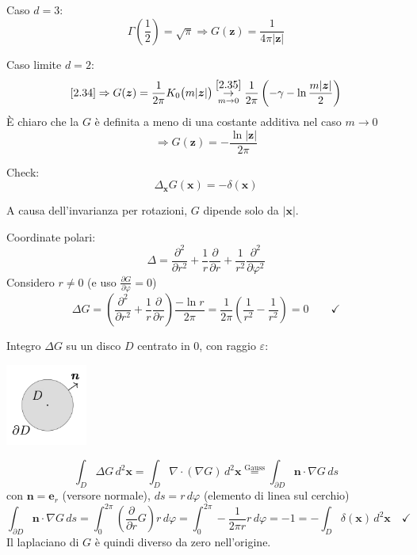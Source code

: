 \documentclass[a4paper,11pt]{report}
\newcommand{\vect}[1]{\boldsymbol{#1}}
\newcommand{\x}{\boldsymbol{x}}
\newcommand{\z}{\boldsymbol{z}}
\begin{document}
Caso $d=3$:
\begin{equation}
\Gamma\left(\frac{1}{2}\right)=\sqrt{\pi} \Rightarrow G(\z)=\frac{1}{4\pi|\z|}
\tag{$\theequation^\prime$}
\label{2.38'}
\end{equation}

Caso limite $d=2$:
\begin{equation}
\eqref{2.34}\Rightarrow G(\z)=\frac{1}{2\pi}K_0\big(m|\z|\big)\underset{m\to 0}{\overset{\eqref{2.35}}{\rightarrow}} \frac{1}{2\pi}\left(-\gamma -\ln \frac{m|\z|}{2}\right)
\end{equation}
\`E chiaro che la $G$ \`e definita a meno di una costante additiva nel caso $m\to 0$
\begin{equation}
\Rightarrow G(\z)=-\frac{\ln |\z|}{2\pi}
\end{equation}

\medskip

Check:
\[
\Delta_{\x}G(\x)=-\delta(\x)
\]

A causa dell'invarianza per rotazioni, $G$ dipende solo da $|\x|$.

Coordinate polari:
\[
\Delta =\frac{\partial^2}{\partial r^2}+\frac{1}{r}\frac{\partial}{\partial r}+\frac{1}{r^2}\frac{\partial ^2}{\partial \varphi^2}
\]
Considero $r\neq 0$ (e uso $\frac{\partial G}{\partial \varphi}=0$)
\[
\Delta G = \left(\frac{\partial^2}{\partial r^2}+\frac{1}{r}\frac{\partial}{\partial r}\right)\frac{-\ln r}{2\pi}=\frac{1}{2\pi}\left(\frac{1}{r^2} - \frac{1}{r^2}\right)=0\qquad \checkmark
\]

Integro $\Delta G$ su un disco $D$ centrato in 0, con raggio $\varepsilon$:
\begin{center}
\includegraphics[width=0.2\textwidth]{immagini/disco}
\end{center}
\[
\int_D \Delta G \, d^2\x=\int_D \nabla\cdot(\nabla G) \, d^2\x \overset{\text{Gauss}}{=}\int_{\partial D} \vect{n} \cdot \nabla G \, ds
\]
con $\vect{n}=\vect{e}_r$ (versore normale), $ds=r\,d\varphi$ (elemento di linea sul cerchio)
\[
\int_{\partial D}\vect{n}\cdot \nabla G \, ds=\int_{0}^{2\pi}\left(\frac{\partial}{\partial r}G\right)r \, d\varphi=\int_0^{2\pi}-\frac{1}{2\pi r}r \, d\varphi =-1 =-\int_D \delta(\x)\, d^2\x \quad \checkmark
\]
Il laplaciano di $G$ \`e quindi diverso da zero nell'origine.
\end{document}
